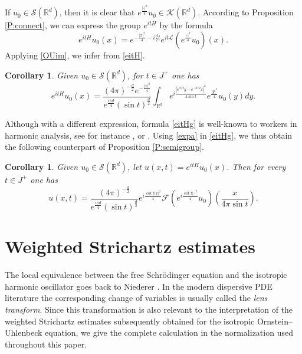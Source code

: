 \documentclass[11pt,a4paper]{amsart}
\def \So {\mathscr{S}(\Rm)}
\newcommand{\Rm}{\mathbb R^d}
\numberwithin{equation}{section}
\newtheorem{corollary}[theorem]{Corollary}
\numberwithin{equation}{section}
\begin{document}
If $u_0\in \So$, then it is clear that $e^{\frac{|\cdot|^2}4} u_0\in \mathscr K(\Rm)$. According to Proposition \ref{P:connect}, we can express the group $e^{itH}$ by the formula
\begin{equation}\label{eitH}
e^{itH} u_0(x) = e^{-\frac{|x|^2}4 - i \frac d2 t} e^{it\mathscr L}(e^{\frac{|\cdot|^2}4} u_0)(x).
\end{equation}
Applying \eqref{OUim}, we infer from \eqref{eitH}.

\begin{corollary}\label{C:HOim}
Given $u_0\in \So$, for $t\in J^+$ one has
\begin{equation}\label{eitHg}
e^{itH} u_0(x) =  \frac{(4\pi
)^{-\frac{d}{2}} e^{-\frac{|x|^2}4}}{e^{\frac{i\pi d}{4}} (\sin t)^{\frac d2}} \int_{\Rm} e^{i \frac{|e^{it/2} y-e^{-it/2} x|^2}{4 \sin t}} e^{\frac{|y|^2}4} u_0(y) dy.
\end{equation}
\end{corollary}
Although with a different expression, formula \eqref{eitHg} is well-known to workers in harmonic analysis, see for instance \cite[Eq. (4.13), p.85]{Vel1}, or \cite[Eq. (6), p.164]{ST}.
Using \eqref{expa} in \eqref{eitHg}, we thus obtain the following counterpart of Proposition \ref{P:semigroup}.

\begin{corollary}\label{C:semigroup}
Given $u_0\in \mathscr S(\Rm)$, let $u(x,t) = e^{itH}u_0(x)$. Then for every $t\in J^+$ one has
\begin{equation}\label{finalino}
u(x,t) =  \frac{(4\pi
)^{-\frac{d}{2}}}{e^{\frac{i\pi d}{4}} (\sin t)^{\frac d2}} e^{i \frac{\cot t |x|^2}{4}} \mathscr F\left(e^{i \frac{\cot t |\cdot|^2}4} u_0\right)(\frac{x}{4 \pi \sin t}).
\end{equation}
\end{corollary} 


\section{Weighted Strichartz estimates}\label{S:strichartz}



The local equivalence between the free Schr\"odinger equation and the isotropic harmonic oscillator goes back to Niederer \cite{Ni1,Ni2}.  In the modern dispersive PDE literature the corresponding change of variables is usually called the \emph{lens transform}.  Since this transformation is also relevant to the interpretation of the weighted Strichartz estimates subsequently obtained for the isotropic Ornstein--Uhlenbeck equation, we give the complete calculation in the normalization used throughout this paper.
\end{document}
